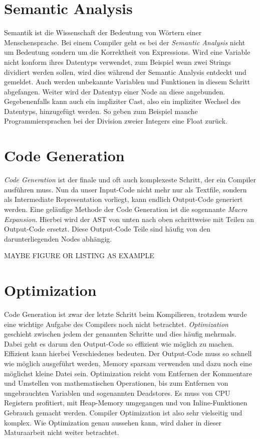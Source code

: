 \section{Semantic Analysis}
Semantik ist die Wissenschaft der Bedeutung von Wörtern einer Menschensprache. Bei einem Compiler geht es bei der \textit{Semantic Analysis} nicht um Bedeutung sondern um die Korrektheit von Expressions.
Wird eine Variable nicht konform ihres Datentyps verwendet, zum Beispiel wenn zwei Strings dividiert werden sollen, wird dies während der Semantic Analysis entdeckt und gemeldet.
Auch werden unbekannte Variablen und Funktionen in diesem Schritt abgefangen.
Weiter wird der Datentyp einer Node an diese angebunden. Gegebenenfalls kann auch ein impliziter Cast, also ein impliziter Wechsel des Datentyps, hinzugefügt werden.
So geben zum Beispiel manche Programmiersprachen bei der Division zweier Integers eine Float zurück.

\section{Code Generation} \label{sec:traditional_code_generation}
\textit{Code Generation} ist der finale und oft auch komplexeste Schritt, der ein Compiler ausführen muss. Nun da unser Input-Code nicht mehr nur als Textfile, sondern als Intermediate Representation vorliegt,
kann endlich Output-Code generiert werden. Eine geläufige Methode der Code Generation ist die sogennante \textit{Macro Expansion}. Hierbei wird der AST von unten nach oben schrittweise mit Teilen an Output-Code ersetzt.
Diese Output-Code Teile sind häufig von den darunterliegenden Nodes abhängig. 

MAYBE FIGURE OR LISTING AS EXAMPLE

\section{Optimization}
Code Generation ist zwar der letzte Schritt beim Kompilieren, trotzdem wurde eine wichtige Aufgabe des Compilers noch nicht betrachtet. \textit{Optimization} geschieht zwischen jedem der genannten Schritte und dies häufig mehrmals.
Dabei geht es darum den Output-Code so effizient wie möglich zu machen. Effizient kann hierbei Verschiedenes bedeuten. Der Output-Code muss so schnell wie möglich ausgeführt werden,
Memory sparsam verwenden und dazu noch eine möglichst kleine Datei sein. Optimization reicht vom Entfernen der Kommentare und Umstellen von mathematischen Operationen, bis zum Entfernen von ungebrauchten Variablen und sogenannten Deadstores.
Es muss von CPU Registern profitiert, mit Heap-Memory umgegangen und von Inline-Funktionen Gebrauch gemacht werden. Compiler Optimization ist also sehr vielseitig und komplex.
Wie Optimization genau aussehen kann, wird daher in dieser Maturaarbeit nicht weiter betrachtet.